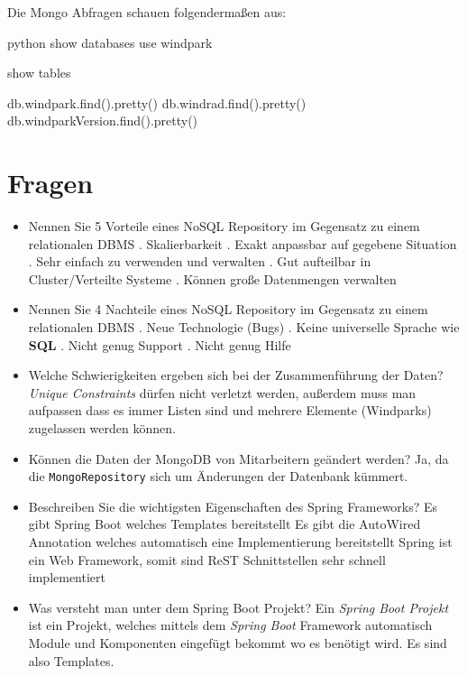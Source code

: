 Die Mongo Abfragen schauen folgendermaßen aus:

\begin{code}{python}
    show databases
    use windpark

    show tables

    db.windpark.find().pretty()
    db.windrad.find().pretty()
    db.windparkVersion.find().pretty()
\end{code}



\clearpage
\section{Fragen}

\begin{itemize}
    \item Nennen Sie 5 Vorteile eines NoSQL Repository im Gegensatz zu einem relationalen DBMS
        . Skalierbarkeit
        . Exakt anpassbar auf gegebene Situation
        . Sehr einfach zu verwenden und verwalten
        . Gut aufteilbar in Cluster/Verteilte Systeme
        . Können große Datenmengen verwalten
    \item Nennen Sie 4 Nachteile eines NoSQL Repository im Gegensatz zu einem relationalen DBMS
        . Neue Technologie (Bugs)
        . Keine universelle Sprache wie \textbf{SQL}
        . Nicht genug Support
        . Nicht genug Hilfe
    \item Welche Schwierigkeiten ergeben sich bei der Zusammenführung der Daten?
        \subitem \textit{Unique Constraints} dürfen nicht verletzt werden, außerdem muss man aufpassen dass es immer Listen sind und mehrere Elemente (Windparks) zugelassen werden können.
    \item Können die Daten der MongoDB von Mitarbeitern geändert werden?
        \subitem Ja, da die \texttt{MongoRepository} sich um Änderungen der Datenbank kümmert.
    \item Beschreiben Sie die wichtigsten Eigenschaften des Spring Frameworks?
        \subitem Es gibt Spring Boot welches Templates bereitstellt
        \subitem Es gibt die AutoWired Annotation welches automatisch eine Implementierung bereitstellt
        \subitem Spring ist ein Web Framework, somit sind ReST Schnittstellen sehr schnell implementiert
    \item Was versteht man unter dem Spring Boot Projekt?
        \subitem Ein \textit{Spring Boot Projekt} ist ein Projekt, welches mittels dem \textit{Spring Boot} Framework automatisch Module und Komponenten eingefügt bekommt wo es benötigt wird. Es sind also Templates.

\end{itemize}
